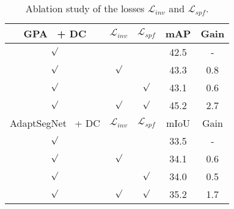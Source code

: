 \documentclass[10pt,journal,compsoc]{IEEEtran}
\begin{document}
\begin{table}[t]
\caption{ Ablation study of the losses $\mathcal{L}_{inv}$ and $\mathcal{L}_{spf}$.
}
\label{table:ablation_each_loss}
\begin{center}
\vspace{-3mm}
\begin{tabular}{ccc|c|c} \toprule
GPA~\cite{GPA} + DC & $\mathcal{L}_{inv}$ & $\mathcal{L}_{spf}$  & mAP & Gain\\
\midrule
$\surd$  &  &  & 42.5 & -\\
$\surd$  & $\surd$  &  & 43.3 & 0.8\\
$\surd$  &   & $\surd$  & 43.1 & 0.6\\
$\surd$  & $\surd$  & $\surd$  & 45.2 & 2.7\\
\midrule
AdaptSegNet~\cite{AdaptSegNet} + DC & $\mathcal{L}_{inv}$  & $\mathcal{L}_{spf}$   & mIoU & Gain\\
\midrule
$\surd$  &  &  & 33.5 & -\\
$\surd$  & $\surd$  &  & 34.1 & 0.6\\
$\surd$  &  & $\surd$  & 34.0 & 0.5\\
$\surd$  & $\surd$ & $\surd$  & 35.2 & 1.7\\
\bottomrule
\end{tabular}
\end{center}
\end{table}

\begin{table}[t]
\caption{
Comparison to related works on the baseline~\cite{AdaptSegNet}. 
}

\centering
{}
\end{table}
\end{document}
